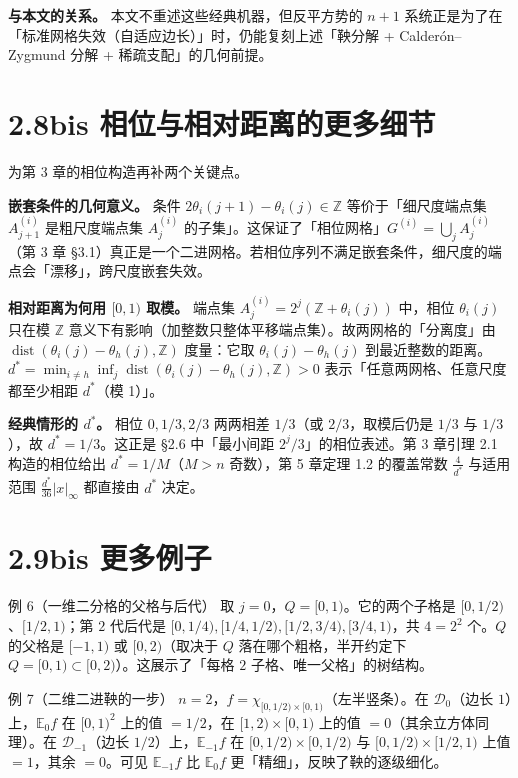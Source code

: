 \documentclass[a4paper,11pt,openany]{ctexbook}
\numberwithin{equation}{chapter}
\numberwithin{figure}{chapter}
\numberwithin{table}{chapter}
\begin{document}
\textbf{与本文的关系。} 本文不重述这些经典机器，但反平方势的 $n+1$ 系统正是为了在「标准网格失效（自适应边长）」时，仍能复刻上述「鞅分解 + Calderón–Zygmund 分解 + 稀疏支配」的几何前提。

\section{2.8bis 相位与相对距离的更多细节}

为第 3 章的相位构造再补两个关键点。

\textbf{嵌套条件的几何意义。} 条件 $2\theta_i(j+1)-\theta_i(j)\in\mathbb Z$ 等价于「细尺度端点集 $A_{j+1}^{(i)}$ 是粗尺度端点集 $A_j^{(i)}$ 的子集」。这保证了「相位网格」$G^{(i)}=\bigcup_j A_j^{(i)}$（第 3 章 §3.1）真正是一个二进网格。若相位序列不满足嵌套条件，细尺度的端点会「漂移」，跨尺度嵌套失效。

\textbf{相对距离为何用 $[0,1)$ 取模。} 端点集 $A_j^{(i)}=2^j(\mathbb Z+\theta_i(j))$ 中，相位 $\theta_i(j)$ 只在模 $\mathbb Z$ 意义下有影响（加整数只整体平移端点集）。故两网格的「分离度」由 $\operatorname{dist}(\theta_i(j)-\theta_h(j),\mathbb Z)$ 度量：它取 $\theta_i(j)-\theta_h(j)$ 到最近整数的距离。$d^*=\min_{i\neq h}\inf_j\operatorname{dist}(\theta_i(j)-\theta_h(j),\mathbb Z)>0$ 表示「任意两网格、任意尺度都至少相距 $d^*$（模 1）」。

\textbf{经典情形的 $d^*$。} 相位 $0,1/3,2/3$ 两两相差 $1/3$（或 $2/3$，取模后仍是 $1/3$ 与 $1/3$），故 $d^*=1/3$。这正是 §2.6 中「最小间距 $2^j/3$」的相位表述。第 3 章引理 2.1 构造的相位给出 $d^*=1/M$（$M>n$ 奇数），第 5 章定理 1.2 的覆盖常数 $\frac4{d^*}$ 与适用范围 $\frac{d^*}{36}|x|_\infty$ 都直接由 $d^*$ 决定。

\section{2.9bis 更多例子}

\begin{examplebox}{例 6（一维二分格的父格与后代）}
取 $j=0$，$Q=[0,1)$。它的两个子格是 $[0,1/2)$、$[1/2,1)$；第 $2$ 代后代是 $[0,1/4),[1/4,1/2),[1/2,3/4),[3/4,1)$，共 $4=2^2$ 个。$Q$ 的父格是 $[-1,1)$ 或 $[0,2)$（取决于 $Q$ 落在哪个粗格，半开约定下 $Q=[0,1)\subset[0,2)$）。这展示了「每格 $2$ 子格、唯一父格」的树结构。
\end{examplebox}

\begin{examplebox}{例 7（二维二进鞅的一步）}
$n=2$，$f=\chi_{[0,1/2)\times[0,1)}$（左半竖条）。在 $\mathcal D_0$（边长 $1$）上，$\mathbb E_0 f$ 在 $[0,1)^2$ 上的值 $=1/2$，在 $[1,2)\times[0,1)$ 上的值 $=0$（其余立方体同理）。在 $\mathcal D_{-1}$（边长 $1/2$）上，$\mathbb E_{-1}f$ 在 $[0,1/2)\times[0,1/2)$ 与 $[0,1/2)\times[1/2,1)$ 上值 $=1$，其余 $=0$。可见 $\mathbb E_{-1}f$ 比 $\mathbb E_0 f$ 更「精细」，反映了鞅的逐级细化。
\end{examplebox}
\end{document}
